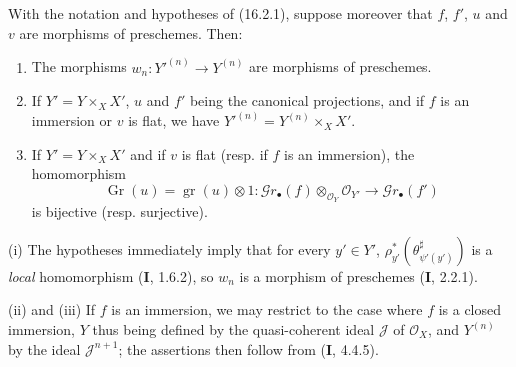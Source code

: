 \begin{proposition}[16.2.2]
\label{IV.16.2.2}
With the notation and hypotheses of \textup{(16.2.1)}, suppose moreover that $f$, $f'$,
$u$ and $v$ are morphisms of preschemes. Then:
\begin{enumerate}
\item[\textup{(i)}] The morphisms $w_n:Y'^{(n)}\to Y^{(n)}$ are morphisms of
preschemes.
\item[\textup{(ii)}] If $Y'=Y\times_X X'$, $u$ and $f'$ being the canonical
projections, and if $f$ is an immersion \textup{or} $v$ is flat, we have
$Y'^{(n)}=Y^{(n)}\times_X X'$.
\item[\textup{(iii)}] If $Y'=Y\times_X X'$ and if $v$ is flat \textup{(resp.} if $f$ is an
immersion\textup{)}, the homomorphism
\[
  \operatorname{Gr}(u)=\operatorname{gr}(u)\otimes 1:
  \mathscr{G}r_\bullet(f)\otimes_{\mathcal{O}_Y}\mathcal{O}_{Y'}
  \longrightarrow\mathscr{G}r_\bullet(f')
\]
is bijective \textup{(resp.} surjective\textup{)}.
\end{enumerate}
\end{proposition}

\noindent(i) The hypotheses immediately imply that for every $y'\in Y'$,
$\rho_{y'}^*(\theta_{\psi'(y')}^\sharp)$ is a \emph{local} homomorphism (\textbf{I}, 1.6.2),
so $w_n$ is a morphism of preschemes (\textbf{I}, 2.2.1).

\noindent(ii) and (iii) If $f$ is an immersion, we may restrict to the case where
$f$ is a closed immersion, $Y$ thus being defined by the quasi-coherent
ideal $\mathscr{J}$ of $\mathcal{O}_X$, and $Y^{(n)}$ by the ideal
$\mathscr{J}^{n+1}$; the assertions then follow from (\textbf{I}, 4.4.5).

